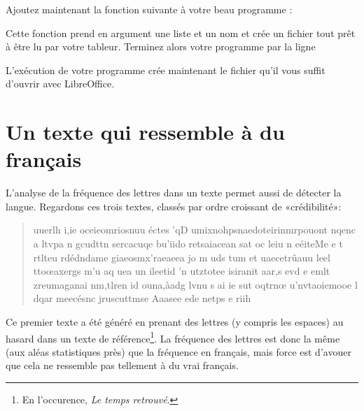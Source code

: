 Ajoutez maintenant la fonction suivante à votre beau programme :



Cette fonction prend en argument une liste  et un nom  et crée un fichier tout prêt à être lu par votre tableur. Terminez alors votre programme par la ligne
\begin{quote}
\end{quote}
L'exécution de votre programme crée maintenant le fichier  qu'il vous suffit d'ouvrir avec LibreOffice.

\section{Un texte qui ressemble à du français}

L'analyse de la fréquence des lettres dans un texte permet aussi de détecter la langue. Regardons ces trois textes, classés par ordre croissant de «crédibilité»:

\begin{quote}
    uuerlh i,ie oceieomriosnuu éctes 'qD umixnohpsnaedoteirinmrpouont nqenc a ltvpa n gcudttn  sercacuqe bu'iido retsaiacean sat oc leiu n  eéiteMe e   t  rtlteu rdédndame giaeosmx'raeaeea  jo m uds tum   et uaecetrûauu leel ttoœaxergs m'u aq uea un ileetid 'n utztotee isiranit aar,s evd e emlt zreumaganai nm,tlren id ouna,àadg lvnu s ai ie sut oqtrnœ u'nvtaoiemooe l  dqar meecésnc  jruscuttmse Aaasee ede netps  e riih
\end{quote}
Ce premier texte a été généré en prenant des lettres (y compris les espaces) au hasard dans un texte de référence\footnote{En l'occurence, \emph{Le temps retrouvé}.}. La fréquence des lettres est donc la même (aux aléas statistiques près) que la fréquence en français, mais force est d'avouer que cela ne ressemble pas tellement à du vrai français.
 

